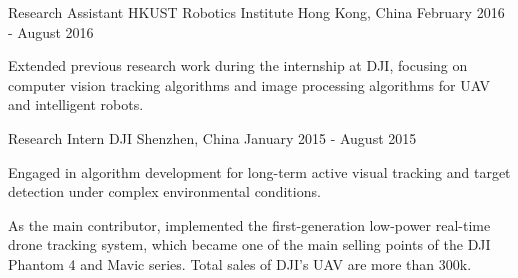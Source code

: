 \begin{cventries}
\cventry
{Research Assistant} %
{HKUST Robotics Institute} %
{Hong Kong, China} %
{February 2016 - August 2016} %
{
	\begin{cvitems} %
		\item {Extended previous research work during the internship at DJI, focusing on computer vision tracking algorithms and image processing algorithms for UAV and intelligent robots.}
	\end{cvitems}
}

\cventry
{Research Intern} %
{DJI} %
{Shenzhen, China} %
{January 2015 - August 2015} %
{
	\begin{cvitems} %
		\item {Engaged in algorithm development for long-term active visual tracking and target detection under complex environmental conditions.}
		\item {As the main contributor, implemented the first-generation low-power real-time drone tracking system, which became one of the main selling points of the DJI Phantom 4 and Mavic series. Total sales of DJI's UAV are more than 300k. }
	\end{cvitems}
}

\end{cventries}
